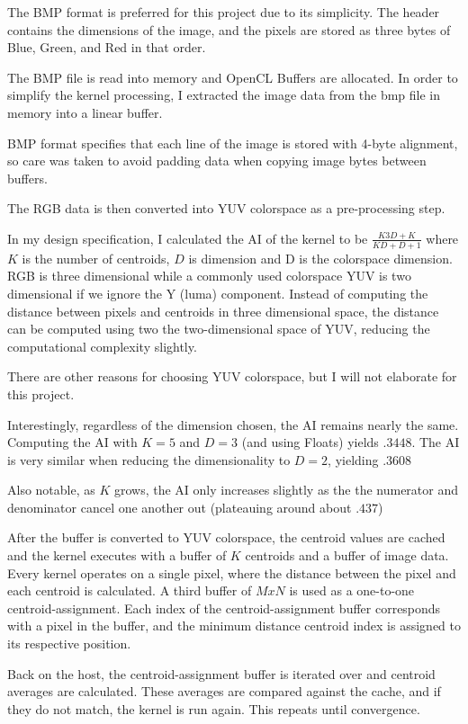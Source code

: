 \documentclass[11pt]{article}
\begin{document}
The BMP format is preferred for this project due to its simplicity. The header
contains the dimensions of the image, and the pixels are stored as three bytes
of Blue, Green, and Red in that order. \cite{bmp_wiki}

The BMP file is read into memory and OpenCL Buffers are allocated. In order to
simplify the kernel processing, I extracted the image data from the bmp file in
memory into a linear buffer. 

BMP format specifies that each line of the image is stored with 4-byte alignment,
so care was taken to avoid padding data when copying image bytes between buffers.

The RGB data is then converted into YUV colorspace as a pre-processing step.

In my design specification, I calculated the AI of the kernel to be 
$\frac{K3D+K}{KD+D+1}$ where $K$ is the number of centroids, $D$ is dimension and 
D is the colorspace dimension. RGB is three dimensional while a commonly used
colorspace YUV is two dimensional if we ignore the Y (luma) component. Instead of 
computing the distance between pixels and centroids in three dimensional space, 
the distance can be computed using two the two-dimensional space of YUV, reducing 
the computational complexity slightly. 

There are other reasons for choosing YUV colorspace, but I will not elaborate for
this project.

Interestingly, regardless of the dimension chosen, the AI remains nearly the same. 
Computing the AI with $K = 5$ and $D = 3$ (and using Floats) yields $.3448$. The AI
is very similar when reducing the dimensionality to $D = 2$, yielding $.3608$

Also notable, as $K$ grows, the AI only increases slightly as the the numerator and 
denominator cancel one another out (plateauing around about $.437$)

After the buffer is converted to YUV colorspace, the centroid values are cached
and the kernel executes with a buffer of $K$ centroids and a buffer of image data.
Every kernel operates on a single pixel, where the distance between the pixel
and each centroid is calculated. A third buffer of $MxN$ is used as a one-to-one 
centroid-assignment. Each index of the centroid-assignment buffer corresponds with
a pixel in the buffer, and the minimum distance centroid index is assigned to its
respective position.

Back on the host, the centroid-assignment buffer is iterated over and centroid 
averages are calculated. These averages are compared against the cache, and if they
do not match, the kernel is run again. This repeats until convergence.
\end{document}
